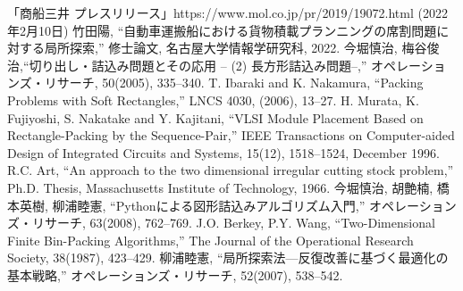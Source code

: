 \documentclass[platex]{jreport}
\begin{document}
\begin{thebibliography}{99}
	「商船三井 プレスリリース」https://www.mol.co.jp/pr/2019/19072.html (2022年2月10日)
	竹田陽, ``自動車運搬船における貨物積載プランニングの席割問題に対する局所探索,'' 修士論文, 名古屋大学情報学研究科, 2022.
	今堀慎治, 梅谷俊治,``切り出し・詰込み問題とその応用 -- (2) 長方形詰込み問題--,'' オペレーションズ・リサーチ, 50(2005), 335--340.
	T. Ibaraki and K. Nakamura, ``Packing Problems with Soft Rectangles,'' LNCS 4030, (2006), 13--27.
	H. Murata, K. Fujiyoshi, S. Nakatake and Y. Kajitani, ``VLSI Module Placement Based on Rectangle-Packing by the Sequence-Pair,'' 
	IEEE Transactions on Computer-aided Design of Integrated Circuits and Systems, 15(12), 1518--1524, December 1996.
	R.C. Art, ``An approach to the two dimensional irregular cutting stock problem,''
	Ph.D. Thesis, Massachusetts Institute of Technology, 1966.
	今堀慎治, 胡艶楠, 橋本英樹, 柳浦睦憲, ``Pythonによる図形詰込みアルゴリズム入門,'' 
	オペレーションズ・リサーチ, 63(2008), 762--769.
	J.O. Berkey, P.Y. Wang, ``Two-Dimensional Finite Bin-Packing Algorithms,'' 
	The Journal of the Operational Research Society, 38(1987), 423--429. 
	柳浦睦憲, ``局所探索法—反復改善に基づく最適化の基本戦略,'' オペレーションズ・リサーチ, 52(2007), 538--542.
	

\end{thebibliography}
\end{document}
